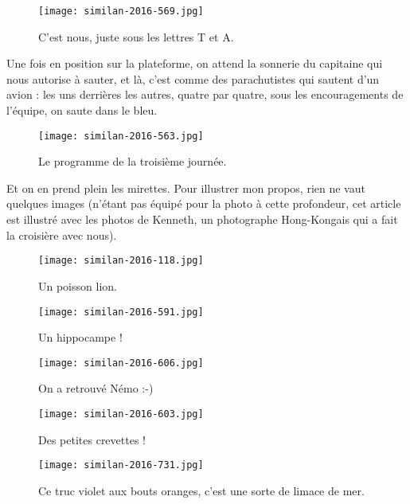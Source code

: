 \documentclass{book}
\begin{document}
\begin{figure}[h]
\centering
\texttt{[image: similan-2016-569.jpg]}
\caption*{C'est nous, juste sous les lettres T et A.}
\end{figure}

Une fois en position sur la plateforme, on attend la sonnerie du capitaine qui nous autorise à sauter, et là, c'est comme des parachutistes qui sautent d'un avion : les uns derrières les autres, quatre par quatre, sous les encouragements de l'équipe, on saute dans le bleu.


\begin{figure}[h]
\centering
\texttt{[image: similan-2016-563.jpg]}
\caption*{Le programme de la troisième journée.}
\end{figure}

Et on en prend plein les mirettes. Pour illustrer mon propos, rien ne vaut quelques images (n'étant pas équipé pour la photo à cette profondeur, cet article est illustré avec les photos de Kenneth, un photographe Hong-Kongais qui a fait la croisière avec nous).


\begin{figure}[h]
\centering
\texttt{[image: similan-2016-118.jpg]}
\caption*{Un poisson lion.}
\end{figure}


\begin{figure}[h]
\centering
\texttt{[image: similan-2016-591.jpg]}
\caption*{Un hippocampe !}
\end{figure}


\begin{figure}[h]
\centering
\texttt{[image: similan-2016-606.jpg]}
\caption*{On a retrouvé Némo :-)}
\end{figure}


\begin{figure}[h]
\centering
\texttt{[image: similan-2016-603.jpg]}
\caption*{Des petites crevettes !}
\end{figure}



\begin{figure}[h]
\centering
\texttt{[image: similan-2016-731.jpg]}
\caption*{Ce truc violet aux bouts oranges, c'est une sorte de limace de mer.}
\end{figure}
\end{document}
